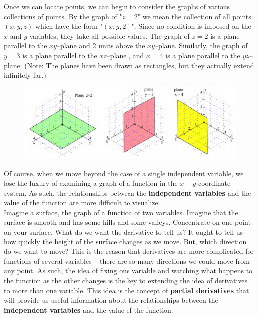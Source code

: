 \noindent Once we can locate points, we can begin to consider the graphs of various collections of points. By the graph of "$z = 2$" we mean the collection of all points $(x, y, z)$ which have the form "$(x, y, 2)$". Since no condition is imposed on the $x$ and $y$ variables, they take all possible values. The graph of $z = 2$ is a plane parallel to the $xy–$plane and 2 units above the $xy–$plane. Similarly, the graph of $y = 3$ is a plane parallel to the $xz–$plane , and $x = 4$ is a plane parallel to the $yz–$plane. (Note: The planes have been drawn as rectangles, but they actually extend infinitely far.)
\begin{figure}[h!]
    \centering
    \includegraphics[scale=0.4]{images/twoVariables/planeEx.png}
    \caption{}
    \label{fig:planeEx}
\end{figure}

\noindent Of course, when we move beyond the case of a single independent variable, we lose the luxury of examining a graph of a function in the $x-y$ coordinate system.  As such, the relationships between the \textbf{independent variables} and the value of the function are more difficult to visualize.\\

\noindent Imagine a surface, the graph of a function of two variables. Imagine that the surface is smooth and has some hills and some valleys. Concentrate on one point on your surface. What do we want the derivative to tell us? It ought to tell us how quickly the height of the surface changes as we move. But, which direction do we want to move? This is the reason that derivatives are more complicated for functions of several variables – there are so many directions we could move from any point. As such, the idea of fixing one variable and watching what happens to the function as the other changes is the key to extending the idea of derivatives to more than one variable. This idea is the concept of \textbf{partial derivatives} that will provide us useful information about the relationships between the \textbf{independent variables} and the value of the function.\\

